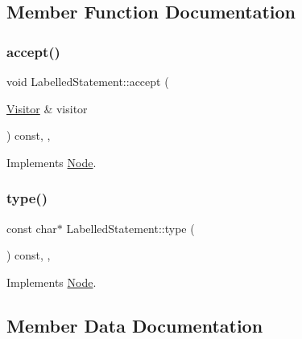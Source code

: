 \subsection{Member Function Documentation}
\mbox{\label{struct_labelled_statement_abc283c24da726909de0b3f96b18b7f86}} 
\subsubsection{\texorpdfstring{accept()}{accept()}}
{\footnotesize\ttfamily void Labelled\+Statement\+::accept (\begin{DoxyParamCaption}\item[{\hyperlink{struct_visitor}{Visitor} \&}]{visitor }\end{DoxyParamCaption}) const\hspace{0.3cm}{\ttfamily [inline]}, {\ttfamily [override]}, {\ttfamily [virtual]}}



Implements \hyperlink{struct_node_a10bd7af968140bbf5fa461298a969c71}{Node}.

\mbox{\label{struct_labelled_statement_a438e8e7376ab4d319e100dd63c0f2d07}} 
\subsubsection{\texorpdfstring{type()}{type()}}
{\footnotesize\ttfamily const char$\ast$ Labelled\+Statement\+::type (\begin{DoxyParamCaption}{ }\end{DoxyParamCaption}) const\hspace{0.3cm}{\ttfamily [inline]}, {\ttfamily [override]}, {\ttfamily [virtual]}}



Implements \hyperlink{struct_node_a82f29420d0a38efcc370352528e94e9b}{Node}.



\subsection{Member Data Documentation}
\mbox{\label{struct_labelled_statement_a5084b8d01545f2b3a37b036769c55e3a}} 
